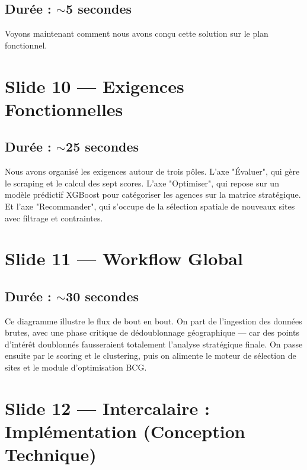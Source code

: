 \documentclass[11pt,a4paper]{article}
\begin{document}
\subsection{Durée : $\sim$5 secondes}
Voyons maintenant comment nous avons conçu cette solution sur le plan fonctionnel.

\section{Slide 10 --- Exigences Fonctionnelles}
\subsection{Durée : $\sim$25 secondes}
Nous avons organisé les exigences autour de trois pôles. L'axe "Évaluer", qui gère le scraping et le calcul des sept scores. L'axe "Optimiser", qui repose sur un modèle prédictif XGBoost pour catégoriser les agences sur la matrice stratégique. Et l'axe "Recommander", qui s'occupe de la sélection spatiale de nouveaux sites avec filtrage et contraintes.

\section{Slide 11 --- Workflow Global}
\subsection{Durée : $\sim$30 secondes}
Ce diagramme illustre le flux de bout en bout. On part de l'ingestion des données brutes, avec une phase critique de dédoublonnage géographique — car des points d'intérêt doublonnés fausseraient totalement l'analyse stratégique finale. On passe ensuite par le scoring et le clustering, puis on alimente le moteur de sélection de sites et le module d'optimisation BCG.

\section{Slide 12 --- Intercalaire : Implémentation (Conception Technique)}
\end{document}
